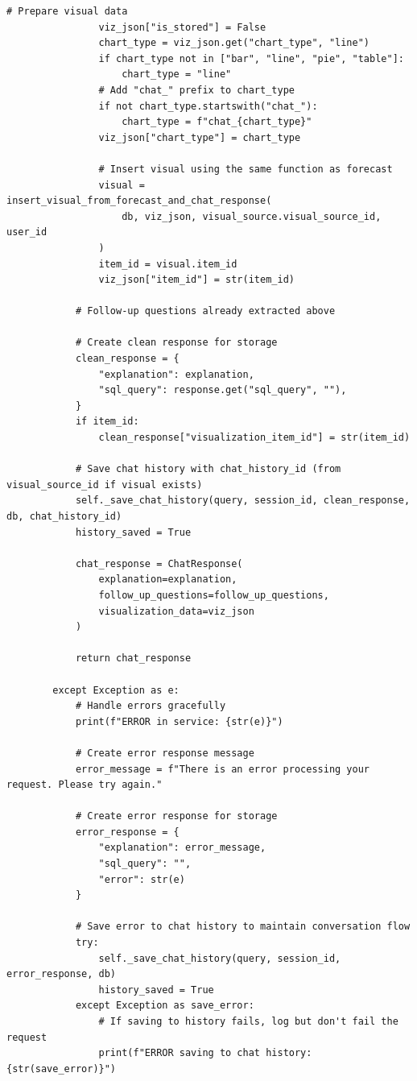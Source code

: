 \begin{lstlisting}[style=python, numbers=none, caption={Text2SQL chat service (\code{text2sql\_service.py})}, label={lst:text2sql-service}]
                # Prepare visual data
                viz_json["is_stored"] = False
                chart_type = viz_json.get("chart_type", "line")
                if chart_type not in ["bar", "line", "pie", "table"]:
                    chart_type = "line"
                # Add "chat_" prefix to chart_type
                if not chart_type.startswith("chat_"):
                    chart_type = f"chat_{chart_type}"
                viz_json["chart_type"] = chart_type

                # Insert visual using the same function as forecast
                visual = insert_visual_from_forecast_and_chat_response(
                    db, viz_json, visual_source.visual_source_id, user_id
                )
                item_id = visual.item_id
                viz_json["item_id"] = str(item_id)

            # Follow-up questions already extracted above

            # Create clean response for storage
            clean_response = {
                "explanation": explanation,
                "sql_query": response.get("sql_query", ""),
            }
            if item_id:
                clean_response["visualization_item_id"] = str(item_id)

            # Save chat history with chat_history_id (from visual_source_id if visual exists)
            self._save_chat_history(query, session_id, clean_response, db, chat_history_id)
            history_saved = True

            chat_response = ChatResponse(
                explanation=explanation,
                follow_up_questions=follow_up_questions,
                visualization_data=viz_json
            )

            return chat_response

        except Exception as e:
            # Handle errors gracefully
            print(f"ERROR in service: {str(e)}")

            # Create error response message
            error_message = f"There is an error processing your request. Please try again."

            # Create error response for storage
            error_response = {
                "explanation": error_message,
                "sql_query": "",
                "error": str(e)
            }

            # Save error to chat history to maintain conversation flow
            try:
                self._save_chat_history(query, session_id, error_response, db)
                history_saved = True
            except Exception as save_error:
                # If saving to history fails, log but don't fail the request
                print(f"ERROR saving to chat history: {str(save_error)}")


\end{lstlisting}
